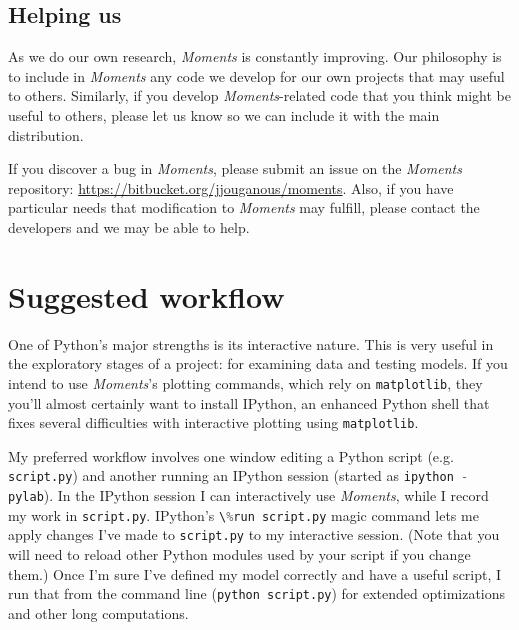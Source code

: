 \documentclass[12pt]{article}
\makeatletter
\newcommand{\dadi}{$\partial$a$\partial$i\xspace}
\newcommand{\py}[1]{\lstinline[language=Python, showstringspaces=False]@#1@}
\makeatother
\begin{document}

\subsection{Helping us}

As we do our own research, \textit{Moments} is constantly improving.
Our philosophy is to include in \textit{Moments} any code we develop for our own projects that may useful to others.
Similarly, if you develop \textit{Moments}-related code that you think might be useful to others, please let us know so we can include it with the main distribution.

If you discover a bug in \textit{Moments}, please submit an issue on the \textit{Moments} repository: \url{https://bitbucket.org/jjouganous/moments}.
Also, if you have particular needs that modification to \textit{Moments} may fulfill, please contact the developers and we may be able to help.

\section{Suggested workflow}

One of Python's major strengths is its interactive nature.
This is very useful in the exploratory stages of a project: for examining data and testing models.
If you intend to use \textit{Moments}'s plotting commands, which rely on \py{matplotlib}, they you'll almost certainly want to install IPython, an enhanced Python shell that fixes several difficulties with interactive plotting using \py{matplotlib}.

My preferred workflow involves one window editing a Python script (e.g. \py{script.py}) and another running an IPython session (started as \py{ipython -pylab}).
In the IPython session I can interactively use \textit{Moments}, while I record my work in \py{script.py}.
IPython's \py{\%run script.py} magic command lets me apply changes I've made to \py{script.py} to my interactive session. 
(Note that you will need to reload other Python modules used by your script if you change them.)
Once I'm sure I've defined my model correctly and have a useful script, I run that from the command line (\py{python script.py}) for extended optimizations and other long computations.
\end{document}
